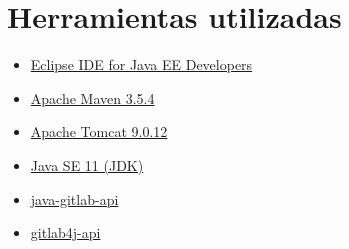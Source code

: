 

\section{Herramientas utilizadas}

\begin{itemize}
	\item \href{https://www.eclipse.org/}{Eclipse IDE for Java EE Developers}
	\item \href{https://maven.apache.org/}{Apache Maven 3.5.4}
	\item \href{http://tomcat.apache.org/}{Apache Tomcat 9.0.12}
	\item \href{https://www.oracle.com/technetwork/java/javase/overview/index.html}{Java SE 11 (JDK)}
	\item \href{https://github.com/timols/java-gitlab-api}{java-gitlab-api}
	\item \href{https://github.com/gmessner/gitlab4j-api}{gitlab4j-api}
\end{itemize}
